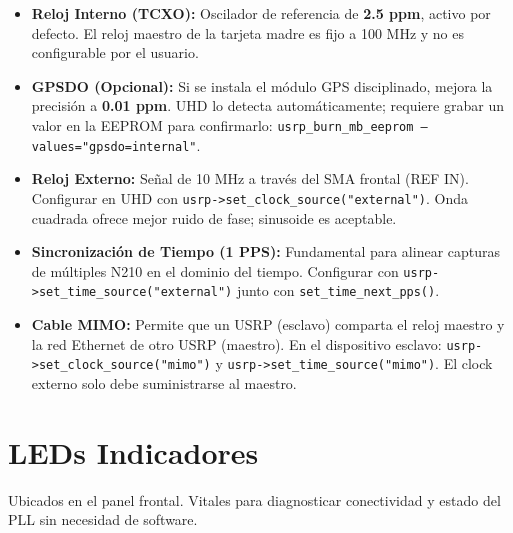 \documentclass[11pt]{article}
\begin{document}
\begin{itemize}
    \item \textbf{Reloj Interno (TCXO):} Oscilador de referencia de \textbf{2.5 ppm}, activo por defecto. El reloj maestro de la tarjeta madre es fijo a 100 MHz y no es configurable por el usuario.
    \item \textbf{GPSDO (Opcional):} Si se instala el módulo GPS disciplinado, mejora la precisión a \textbf{0.01 ppm}. UHD lo detecta automáticamente; requiere grabar un valor en la EEPROM para confirmarlo: \texttt{usrp\_burn\_mb\_eeprom --values="gpsdo=internal"}.
    \item \textbf{Reloj Externo:} Señal de 10 MHz a través del SMA frontal (REF IN). Configurar en UHD con \texttt{usrp->set\_clock\_source("external")}. Onda cuadrada ofrece mejor ruido de fase; sinusoide es aceptable.
    \item \textbf{Sincronización de Tiempo (1 PPS):} Fundamental para alinear capturas de múltiples N210 en el dominio del tiempo. Configurar con \texttt{usrp->set\_time\_source("external")} junto con \texttt{set\_time\_next\_pps()}.
    \item \textbf{Cable MIMO:} Permite que un USRP (esclavo) comparta el reloj maestro y la red Ethernet de otro USRP (maestro). En el dispositivo esclavo: \texttt{usrp->set\_clock\_source("mimo")} y \texttt{usrp->set\_time\_source("mimo")}. El clock externo solo debe suministrarse al maestro.
\end{itemize}

\section{LEDs Indicadores}

Ubicados en el panel frontal. Vitales para diagnosticar conectividad y estado del PLL sin necesidad de software.
\end{document}
